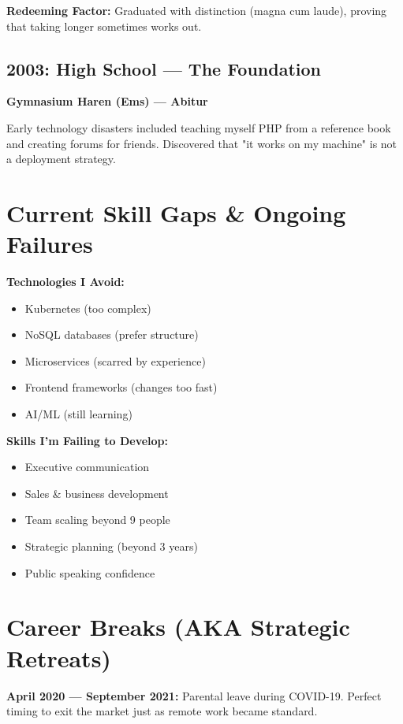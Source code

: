 \documentclass[10pt,a4paper]{article}
\begin{document}
\textbf{Redeeming Factor:} Graduated with distinction (magna cum laude), proving that taking longer sometimes works out.

\subsection{2003: High School — The Foundation}
\textbf{Gymnasium Haren (Ems) — Abitur}

Early technology disasters included teaching myself PHP from a reference book and creating forums for friends. Discovered that "it works on my machine" is not a deployment strategy.

\section{Current Skill Gaps \& Ongoing Failures}

\begin{multicols}{2}
\textbf{Technologies I Avoid:}
\begin{itemize}[leftmargin=1em, itemsep=0.1em]
\item Kubernetes (too complex)
\item NoSQL databases (prefer structure)
\item Microservices (scarred by experience)
\item Frontend frameworks (changes too fast)
\item AI/ML (still learning)
\end{itemize}

\textbf{Skills I'm Failing to Develop:}
\begin{itemize}[leftmargin=1em, itemsep=0.1em]
\item Executive communication
\item Sales \& business development
\item Team scaling beyond 9 people
\item Strategic planning (beyond 3 years)
\item Public speaking confidence
\end{itemize}
\end{multicols}

\section{Career Breaks (AKA Strategic Retreats)}

\textbf{April 2020 — September 2021:} Parental leave during COVID-19. Perfect timing to exit the market just as remote work became standard.
\end{document}

